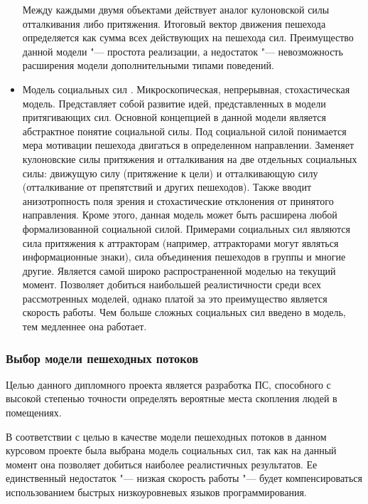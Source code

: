 \begin{itemize}
        Между каждыми двумя объектами действует аналог кулоновской силы отталкивания либо притяжения.
        Итоговый вектор движения пешехода определяется как сумма всех действующих на пешехода сил.
        Преимущество данной модели "--- простота реализации, а недостаток "--- невозможность расширения модели дополнительными типами поведений.
  \item Модель социальных сил \cite{helbing_social_force}.
        Микроскопическая, непрерывная, стохастическая модель.
        Представляет собой развитие идей, представленных в модели притягивающих сил.
        Основной концепцией в данной модели является абстрактное понятие социальной силы. Под социальной силой понимается мера мотивации пешехода двигаться в определенном направлении.
        Заменяет кулоновские силы притяжения и отталкивания на две отдельных социальных силы: движущую силу (притяжение к цели) и отталкивающую силу (отталкивание от препятствий и других пешеходов).
        Также вводит анизотропность поля зрения и стохастические отклонения от принятого направления.
        Кроме этого, данная модель может быть расширена любой формализованной социальной силой.
        Примерами социальных сил являются сила притяжения к аттракторам (например, аттракторами могут являться информационные знаки), сила объединения пешеходов в группы и многие другие.
        Является самой широко распространенной моделью на текущий момент.
        Позволяет добиться наибольшей реалистичности среди всех рассмотренных моделей, однако платой за это преимущество является скорость работы.
        Чем больше сложных социальных сил введено в модель, тем медленнее она работает.
\end{itemize}

\subsubsection{Выбор модели пешеходных потоков}
\label{sec:model:choice}

Целью данного дипломного проекта является разработка ПС, способного с высокой степенью точности определять вероятные места скопления людей в помещениях.

В соответствии с целью в качестве модели пешеходных потоков в данном курсовом проекте была выбрана модель социальных сил,
так как на данный момент она позволяет добиться наиболее реалистичных результатов.
Ее единственный недостаток "--- низкая скорость работы "--- будет компенсироваться использованием быстрых низкоуровневых языков программирования.

